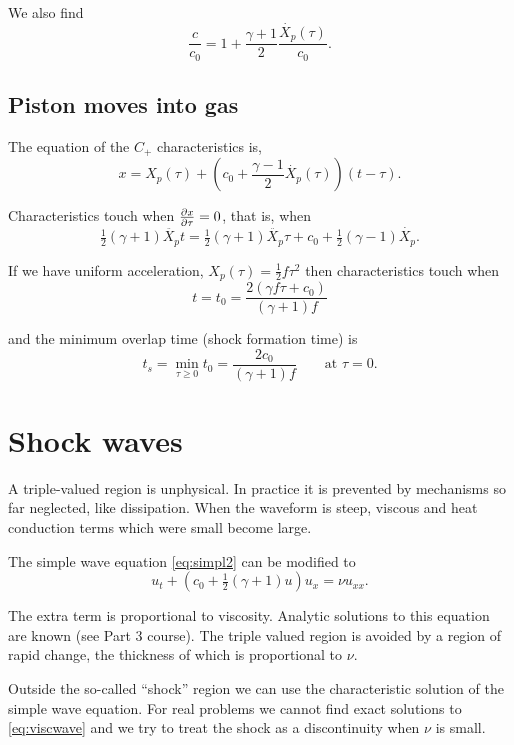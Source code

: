 \documentclass{notes}
\begin{document}
We also find
\[
\frac{c}{c_0} = 1 + \frac{\gamma + 1}{2} \frac{\dot{X_p}(\tau)}{c_0}.
\]

\subsection{Piston moves into gas}

\vspace{2in}

The equation of the $C_+$ characteristics is,
\[
x = X_p(\tau) + \left( c_0 + \frac{\gamma - 1}{2} \dot{X_p}(\tau) \right)
(t - \tau).
\]

Characteristics touch when $\frac{\partial x}{\partial \tau} = 0$, that is, when
\[
\tfrac{1}{2}\left(\gamma + 1 \right) \ddot{X_p} t
= \tfrac{1}{2} \left( \gamma + 1 \right) \ddot{X_p} \tau + c_0
+ \tfrac{1}{2} (\gamma - 1) \dot{X_p}.
\]

If we have uniform acceleration, $X_p(\tau) = \tfrac{1}{2} f \tau^2$ then
characteristics touch when
\[
t=t_0 = \frac{2 ( \gamma f \tau + c_0 )}{(\gamma + 1) f}
\]

and the minimum overlap time (shock formation time) is
\[
t_s = \min_{\tau \ge 0} t_0 = \frac{2 c_0}{(\gamma + 1)f} \qquad \text{at }
\tau = 0.
\]

\section{Shock waves}

A triple-valued region is unphysical.  In practice it is prevented
by mechanisms so far neglected, like dissipation.  When the waveform
is steep, viscous and heat conduction terms which were small become large.

The simple wave equation \eqref{eq:simpl2} can be modified to
\begin{equation}\label{eq:viscwave}
u_t + \left(c_0 + \tfrac{1}{2} (\gamma + 1) u\right) u_x = \nu u_{xx}. 
\end{equation}

The extra term is proportional to viscosity.  Analytic solutions to this
equation are known (see Part 3 course).  The triple valued region is avoided by
a region of rapid change, the thickness of which is proportional to $\nu$.

\vspace{1.5in}

Outside the so-called ``shock'' region we can use the characteristic
solution of the simple wave equation.  For real problems we cannot find
exact solutions to \eqref{eq:viscwave} and we try to treat the shock
as a discontinuity when $\nu$ is small.
\end{document}
